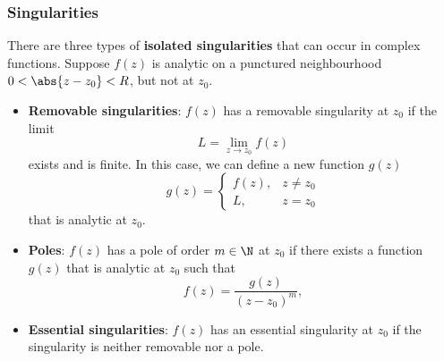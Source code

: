 \documentclass{article}
\begin{document}
\subsubsection{Singularities}
There are three types of \textbf{isolated singularities} that can occur
in complex functions. Suppose \(f\left( z \right)\) is analytic on a
punctured neighbourhood \(0 < \abs{z - z_0} < R\), but not at \(z_0\).
\begin{itemize}
    \item \textbf{Removable singularities}: \(f\left( z \right)\) has a
          removable singularity at \(z_0\) if the limit
          \begin{equation*}
              L = \lim_{z \to z_0} f\left( z \right)
          \end{equation*}
          exists and is finite. In this case, we can define a new
          function \(g\left( z \right)\)
          \begin{equation*}
              g\left( z \right) =
              \begin{cases}
                  f\left( z \right), & z \neq z_0 \\
                  L,                 & z = z_0
              \end{cases}
          \end{equation*}
          that is analytic at \(z_0\).
    \item \textbf{Poles}: \(f\left( z \right)\) has a pole of
          order \(m \in \N\) at \(z_0\) if there exists a function
          \(g\left( z \right)\) that is analytic at \(z_0\) such that
          \begin{equation*}
              f\left( z \right) = \frac{g\left( z \right)}{\left( z - z_0 \right)^m},
          \end{equation*}
    \item \textbf{Essential singularities}: \(f\left( z \right)\) has an
          essential singularity at \(z_0\) if the singularity is neither
          removable nor a pole.
\end{itemize}
\end{document}
